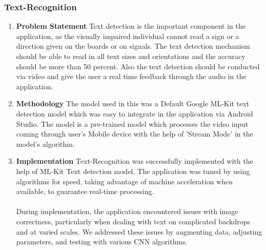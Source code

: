\documentclass[MScCS]{uccthesis}
\begin{document}
\subsubsection{Text-Recognition}
\begin{enumerate}
\item \textbf{Problem Statement}
Text detection is the important component in the application, as the visually impaired individual cannot read a sign or a direction given on the boards or on signals. The text detection mechanism should be able to read in all text sizes and orientations and the accuracy should be more than 50 percent. Also the text detection should be conducted via video and give the user a real time feedback through the audio in the application.
\item \textbf{Methodology}
The model used in this was a Default Google ML-Kit text detection model which was easy to integrate in the application via Android Studio. The model is a pre-trained model which processes the video input coming through user's Mobile device with the help of 'Stream Mode' in the model's algorithm.
\item \textbf{Implementation}
Text-Recognition was successfully implemented with the help of ML-Kit Text detection model. The application was tuned by using algorithms for speed, taking advantage of machine acceleration when available, to guarantee real-time processing.\\
\\During implementation, the application encountered issues with image correctness, particularly when dealing with text on complicated backdrops and at varied scales. We addressed these issues by augmenting data, adjusting parameters, and testing with various CNN algorithms.
\end{enumerate}
\end{document}
